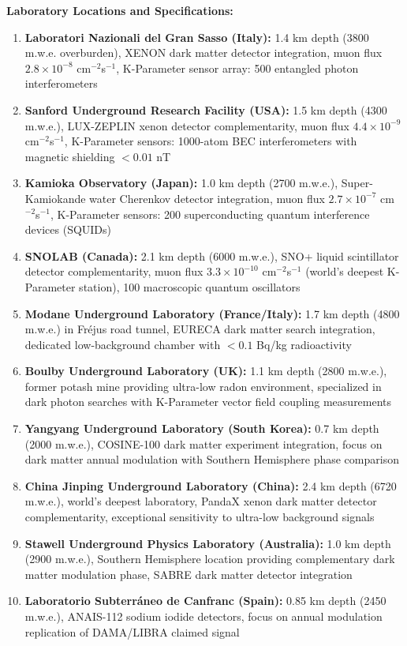 \documentclass[11pt,a4paper,twoside]{article}
\begin{document}
\textbf{Laboratory Locations and Specifications:}
\begin{enumerate}[leftmargin=*]
    \item \textbf{Laboratori Nazionali del Gran Sasso (Italy):} 1.4 km depth (3800 m.w.e. overburden), XENON dark matter detector integration, muon flux $2.8 \times 10^{-8}$ cm$^{-2}$s$^{-1}$, K-Parameter sensor array: 500 entangled photon interferometers

    \item \textbf{Sanford Underground Research Facility (USA):} 1.5 km depth (4300 m.w.e.), LUX-ZEPLIN xenon detector complementarity, muon flux $4.4 \times 10^{-9}$ cm$^{-2}$s$^{-1}$, K-Parameter sensors: 1000-atom BEC interferometers with magnetic shielding $<0.01$ nT

    \item \textbf{Kamioka Observatory (Japan):} 1.0 km depth (2700 m.w.e.), Super-Kamiokande water Cherenkov detector integration, muon flux $2.7 \times 10^{-7}$ cm$^{-2}$s$^{-1}$, K-Parameter sensors: 200 superconducting quantum interference devices (SQUIDs)

    \item \textbf{SNOLAB (Canada):} 2.1 km depth (6000 m.w.e.), SNO+ liquid scintillator detector complementarity, muon flux $3.3 \times 10^{-10}$ cm$^{-2}$s$^{-1}$ (world's deepest K-Parameter station), 100 macroscopic quantum oscillators

    \item \textbf{Modane Underground Laboratory (France/Italy):} 1.7 km depth (4800 m.w.e.) in Fréjus road tunnel, EURECA dark matter search integration, dedicated low-background chamber with $<0.1$ Bq/kg radioactivity

    \item \textbf{Boulby Underground Laboratory (UK):} 1.1 km depth (2800 m.w.e.), former potash mine providing ultra-low radon environment, specialized in dark photon searches with K-Parameter vector field coupling measurements

    \item \textbf{Yangyang Underground Laboratory (South Korea):} 0.7 km depth (2000 m.w.e.), COSINE-100 dark matter experiment integration, focus on dark matter annual modulation with Southern Hemisphere phase comparison

    \item \textbf{China Jinping Underground Laboratory (China):} 2.4 km depth (6720 m.w.e.), world's deepest laboratory, PandaX xenon dark matter detector complementarity, exceptional sensitivity to ultra-low background signals

    \item \textbf{Stawell Underground Physics Laboratory (Australia):} 1.0 km depth (2900 m.w.e.), Southern Hemisphere location providing complementary dark matter modulation phase, SABRE dark matter detector integration

    \item \textbf{Laboratorio Subterráneo de Canfranc (Spain):} 0.85 km depth (2450 m.w.e.), ANAIS-112 sodium iodide detectors, focus on annual modulation replication of DAMA/LIBRA claimed signal
\end{enumerate}
\end{document}
